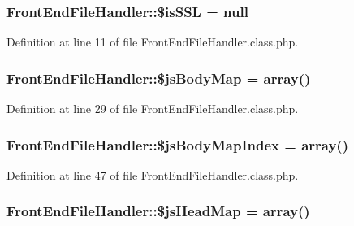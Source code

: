 \subsubsection[{\$is\+S\+S\+L}]{\setlength{\rightskip}{0pt plus 5cm}Front\+End\+File\+Handler\+::\$is\+S\+S\+L = null\hspace{0.3cm}{\ttfamily [static]}}\label{classFrontEndFileHandler_a1e709934ab4023d10850268064d771bc}


Definition at line 11 of file Front\+End\+File\+Handler.\+class.\+php.

\hypertarget{classFrontEndFileHandler_ad03de614a088bc386c393543a3cd9aed}{}
\subsubsection[{\$js\+Body\+Map}]{\setlength{\rightskip}{0pt plus 5cm}Front\+End\+File\+Handler\+::\$js\+Body\+Map = array()}\label{classFrontEndFileHandler_ad03de614a088bc386c393543a3cd9aed}


Definition at line 29 of file Front\+End\+File\+Handler.\+class.\+php.

\hypertarget{classFrontEndFileHandler_aba61415d3f993f1f6b9cddc0024f50b1}{}
\subsubsection[{\$js\+Body\+Map\+Index}]{\setlength{\rightskip}{0pt plus 5cm}Front\+End\+File\+Handler\+::\$js\+Body\+Map\+Index = array()}\label{classFrontEndFileHandler_aba61415d3f993f1f6b9cddc0024f50b1}


Definition at line 47 of file Front\+End\+File\+Handler.\+class.\+php.

\hypertarget{classFrontEndFileHandler_ab434f9c8c874aaf8186e259dff95d116}{}
\subsubsection[{\$js\+Head\+Map}]{\setlength{\rightskip}{0pt plus 5cm}Front\+End\+File\+Handler\+::\$js\+Head\+Map = array()}\label{classFrontEndFileHandler_ab434f9c8c874aaf8186e259dff95d116}


